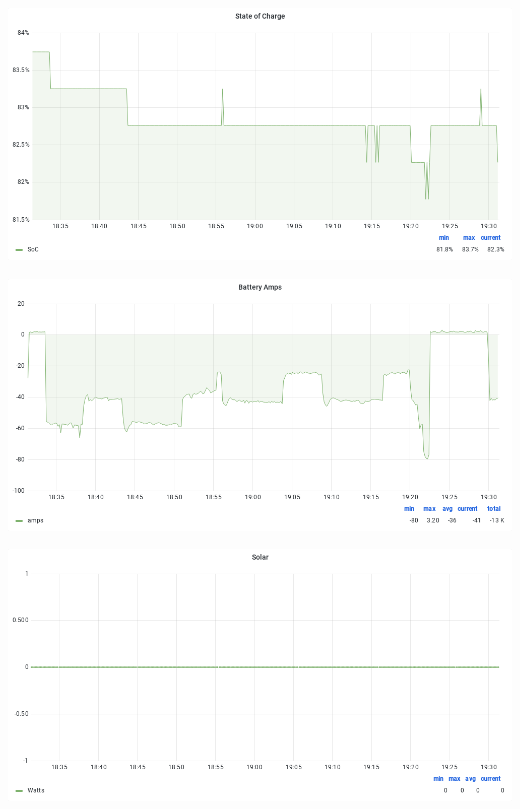 \documentclass{article}
\begin{document}
\begin{center}
\par
\vspace{0.5cm}
\par
\vspace{0.5cm}
\includegraphics[width=\textwidth]{image42}
\par
\vspace{0.5cm}
\par
\vspace{0.5cm}
\includegraphics[width=\textwidth]{image34}
\par
\vspace{0.5cm}
\par
\vspace{0.5cm}
\includegraphics[width=\textwidth]{image40}

\end{center}
\end{document}
